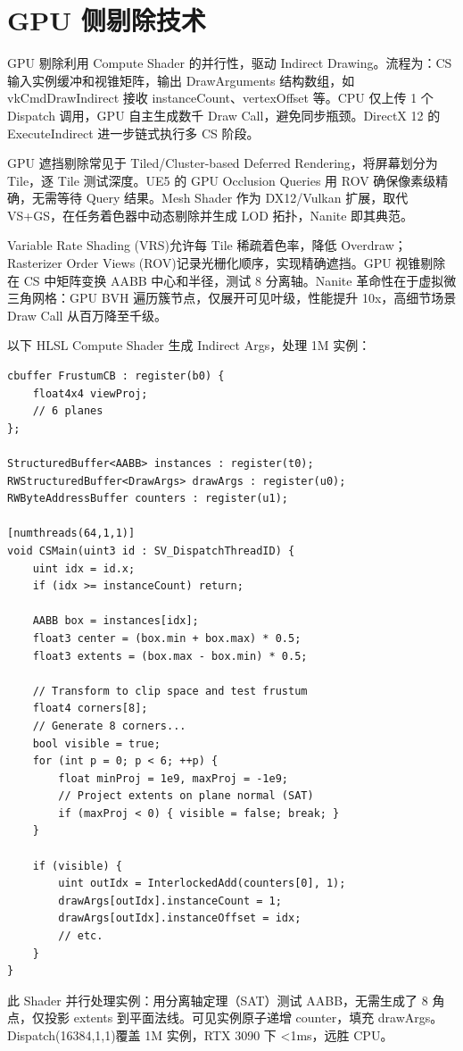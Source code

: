 \chapter{GPU 侧剔除技术}
GPU 剔除利用 Compute Shader 的并行性，驱动 Indirect Drawing。流程为：CS 输入实例缓冲和视锥矩阵，输出 DrawArguments 结构数组，如 vkCmdDrawIndirect 接收 instanceCount、vertexOffset 等。CPU 仅上传 1 个 Dispatch 调用，GPU 自主生成数千 Draw Call，避免同步瓶颈。DirectX 12 的 ExecuteIndirect 进一步链式执行多 CS 阶段。\par
GPU 遮挡剔除常见于 Tiled/Cluster-based Deferred Rendering，将屏幕划分为 Tile，逐 Tile 测试深度。UE5 的 GPU Occlusion Queries 用 ROV 确保像素级精确，无需等待 Query 结果。Mesh Shader 作为 DX12/Vulkan 扩展，取代 VS+GS，在任务着色器中动态剔除并生成 LOD 拓扑，Nanite 即其典范。\par
Variable Rate Shading (VRS)允许每 Tile 稀疏着色率，降低 Overdraw；Rasterizer Order Views (ROV)记录光栅化顺序，实现精确遮挡。GPU 视锥剔除在 CS 中矩阵变换 AABB 中心和半径，测试 8 分离轴。Nanite 革命性在于虚拟微三角网格：GPU BVH 遍历簇节点，仅展开可见叶级，性能提升 10x，高细节场景 Draw Call 从百万降至千级。\par
以下 HLSL Compute Shader 生成 Indirect Args，处理 1M 实例：\par
\begin{lstlisting}
cbuffer FrustumCB : register(b0) {
    float4x4 viewProj;
    // 6 planes
};

StructuredBuffer<AABB> instances : register(t0);
RWStructuredBuffer<DrawArgs> drawArgs : register(u0);
RWByteAddressBuffer counters : register(u1);

[numthreads(64,1,1)]
void CSMain(uint3 id : SV_DispatchThreadID) {
    uint idx = id.x;
    if (idx >= instanceCount) return;
    
    AABB box = instances[idx];
    float3 center = (box.min + box.max) * 0.5;
    float3 extents = (box.max - box.min) * 0.5;
    
    // Transform to clip space and test frustum
    float4 corners[8];
    // Generate 8 corners...
    bool visible = true;
    for (int p = 0; p < 6; ++p) {
        float minProj = 1e9, maxProj = -1e9;
        // Project extents on plane normal (SAT)
        if (maxProj < 0) { visible = false; break; }
    }
    
    if (visible) {
        uint outIdx = InterlockedAdd(counters[0], 1);
        drawArgs[outIdx].instanceCount = 1;
        drawArgs[outIdx].instanceOffset = idx;
        // etc.
    }
}
\end{lstlisting}
此 Shader 并行处理实例：用分离轴定理（SAT）测试 AABB，无需生成了 8 角点，仅投影 extents 到平面法线。可见实例原子递增 counter，填充 drawArgs。Dispatch(16384,1,1)覆盖 1M 实例，RTX 3090 下 <1ms，远胜 CPU。\par
